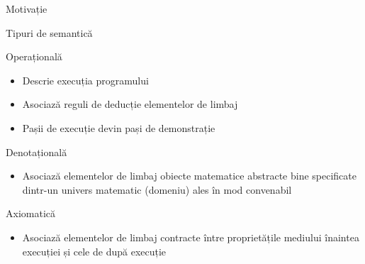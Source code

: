 \documentclass[xcolor=pdftex,romanian,colorlinks]{beamer}
\begin{document}
\begin{section}{Motivație}
\begin{frame}{Tipuri de semantică}
\begin{itemize}
\vitem Operațională
\begin{itemize}
\item Descrie execuția programului
\item Asociază reguli de deducție elementelor de limbaj
\item Pașii de execuție devin pași de demonstrație
\end{itemize}
\vitem Denotațională
\begin{itemize}
\item Asociază elementelor de limbaj obiecte matematice abstracte bine specificate dintr-un univers matematic (domeniu) ales în mod convenabil
\end{itemize}
\vitem  Axiomatică
\begin{itemize}
\item Asociază elementelor de limbaj contracte între proprietățile mediului înaintea execuției și cele de după execuție
\end{itemize}
\end{itemize}
\end{frame}

\end{section}
\end{document}

